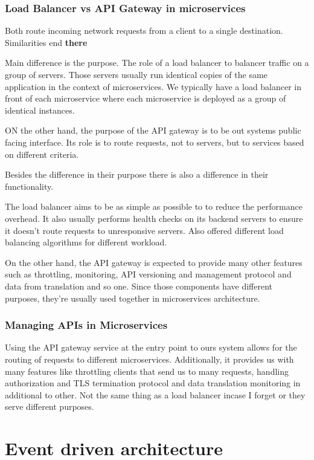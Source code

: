 \documentclass[a4paper, 11pt]{book}
\begin{document}
    \subsubsection{Load Balancer vs API Gateway in microservices}

    Both route incoming network requests from a client to a single destination.
    Similarities end \textbf{there}

    Main difference is the purpose.
    The role of a load balancer to balancer traffic on a group of servers.
    Those servers usually run identical copies of the same application in the context of microservices.
    We typically have a load balancer in front of each microservice where each microservice is deployed as a group of identical instances.

    ON the other hand, the purpose of the API gateway is to be out systems public facing interface.
    Its role is to route requests, not to servers, but to services based on different criteria.

    Besides the difference in their purpose there is also a difference in their functionality.

    The load balancer aims to be as simple as possible to to reduce the performance overhead.
    It also usually performs health checks on its backend servers to ensure it doesn't route requests to unresponsive servers.
    Also offered different load balancing algorithms for different workload.

    On the other hand, the API gateway is expected to provide many other features such as throttling, monitoring, API versioning and management protocol and data from translation and so one.
    Since those components have different purposes, they're usually used together in microservices architecture.

    \subsubsection{Managing APIs in Microservices}
    Using the API gateway service at the entry point to ours system allows for the routing of requests to different microservices.
    Additionally, it provides us with many features like throttling clients that send us to many requests, handling authorization and TLS termination protocol and data translation monitoring in additional to other.
    Not the same thing as a load balancer incase I forget or they serve different purposes.


    \section{Event driven architecture}
\end{document}

